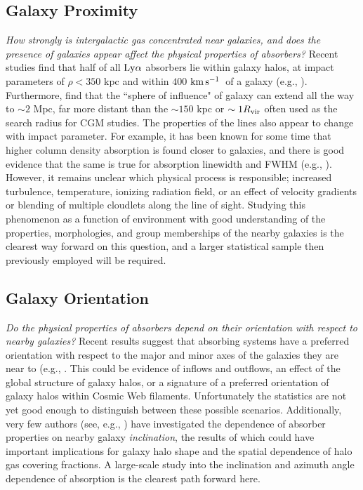 \documentclass[twocolumn,tighten]{aastex62}
\newcommand{\kms}{$\rm km\, s^{-1}$}
\begin{document}
\subsection{Galaxy Proximity}
\emph{How strongly is intergalactic gas concentrated near galaxies, and does the presence of galaxies appear affect the physical properties of absorbers?} Recent studies find that half of all $\rm Ly\alpha$ absorbers lie within galaxy halos, at impact parameters of $\rho <350$ kpc and within $400$ \kms~of a galaxy (e.g., \citealt{cote2005, prochaska2006, wakker2009}). Furthermore, \cite{sorini2018} find that the ``sphere of influence" of galaxy can extend all the way to $\sim 2$ Mpc, far more distant than the $\sim150$ kpc or $\sim 1 R_{\rm vir}$ often used as the search radius for CGM studies. The properties of the lines also appear to change with impact parameter. For example, it has been known for some time that higher column density absorption is found closer to galaxies, and there is good evidence that the same is true for absorption linewidth and FWHM (e.g., \citealt{wakker2009, prochaska2011}). However, it remains unclear which physical process is responsible; increased turbulence, temperature, ionizing radiation field, or an effect of velocity gradients or blending of multiple cloudlets along the line of sight. Studying this phenomenon as a function of environment with good understanding of the properties, morphologies, and group memberships of the nearby galaxies is the clearest way forward on this question, and a larger statistical sample then previously employed will be required.


\subsection{Galaxy Orientation}
\emph{Do the physical properties of absorbers depend on their orientation with respect to nearby galaxies?} Recent results suggest that absorbing systems have a preferred orientation with respect to the major and minor axes of the galaxies they are near to (e.g., \citealt{kacprzak2011_inclination, kacprzak2012}. This could be evidence of inflows and outflows, an effect of the global structure of galaxy halos, or a signature of a preferred orientation of galaxy halos within Cosmic Web filaments. Unfortunately the statistics are not yet good enough to distinguish between these possible scenarios. Additionally, very few authors (see, e.g., \cite{mathes2014, bordoloi2014}) have investigated the dependence of absorber properties on nearby galaxy \emph{inclination}, the results of which could have important implications for galaxy halo shape and the spatial dependence of halo gas covering fractions. A large-scale study into the inclination and azimuth angle dependence of absorption is the clearest path forward here.
\end{document}
